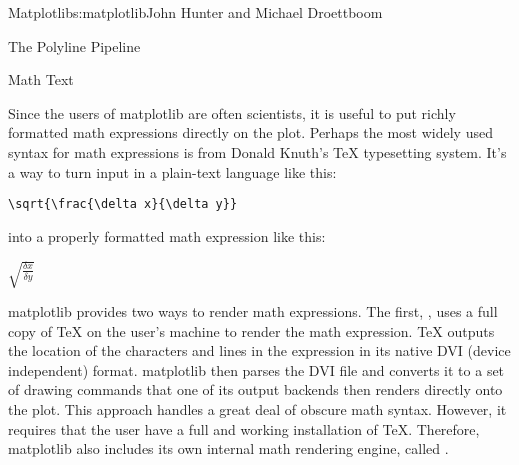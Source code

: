 \begin{aosachapter}{Matplotlib}{s:matplotlib}{John Hunter and Michael Droettboom}
\begin{aosasect1}{The Polyline Pipeline}
\begin{aosaenumerate}
\end{aosaenumerate}



\end{aosasect1}

\begin{aosasect1}{Math Text}

Since the users of matplotlib are often scientists, it is useful to
put richly formatted math expressions directly on the plot.  Perhaps
the most widely used syntax for math expressions is from Donald
Knuth's TeX typesetting system.  It's a way to turn input in a
plain-text language like this: 

\begin{verbatim}
\sqrt{\frac{\delta x}{\delta y}}
\end{verbatim}

\noindent into a properly formatted math expression like this:

\vspace{10px}
$\sqrt{\frac{\delta x}{\delta y}}$
\vspace{10px}

matplotlib provides two ways to render math expressions.  The first,
, uses a full copy of TeX on the user's machine to render the
math expression.  TeX outputs the location of the characters and
lines in the expression in its native DVI (device independent) format.
matplotlib then parses the DVI file and converts it to a set of
drawing commands that one of its output backends then renders directly
onto the plot.  This approach handles a great deal of obscure math
syntax. However, it requires that the user have a full and working
installation of TeX.  Therefore, matplotlib also includes its own
internal math rendering engine, called .


\end{aosasect1}
\end{aosachapter}
